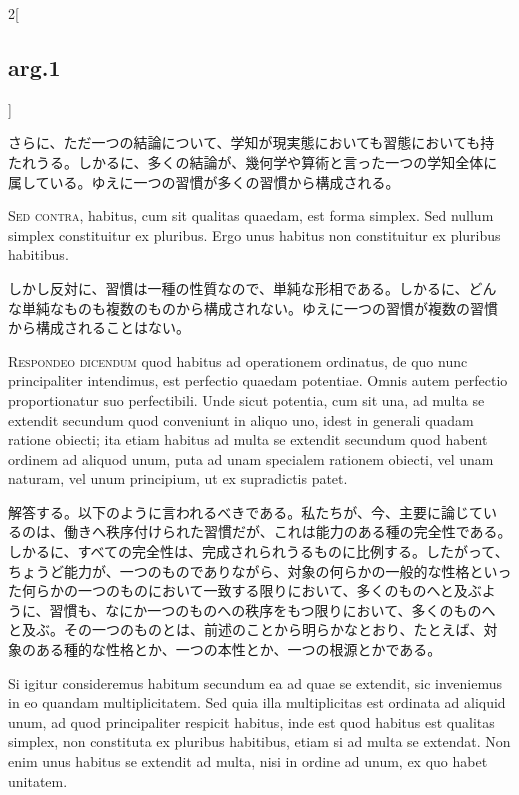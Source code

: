 \documentclass[paper=a4paper,fontsize=10pt,jafontsize=9pt,titlepage]{jlreq}
\begin{document}
\begin{paracol}{2}[\subsection{arg.1}]
\switchcolumn

さらに、ただ一つの結論について、学知が現実態においても習態においても持
たれうる。しかるに、多くの結論が、幾何学や算術と言った一つの学知全体に
属している。ゆえに一つの習慣が多くの習慣から構成される。

\switchcolumn*[\subsection{s.c.}]

{\scshape Sed contra}, habitus, cum sit qualitas quaedam, est forma
simplex. Sed nullum simplex constituitur ex pluribus. Ergo unus
habitus non constituitur ex pluribus habitibus.

\switchcolumn

しかし反対に、習慣は一種の性質なので、単純な形相である。しかるに、どん
な単純なものも複数のものから構成されない。ゆえに一つの習慣が複数の習慣
から構成されることはない。


{\scshape Respondeo dicendum} quod habitus ad operationem ordinatus,
de quo nunc principaliter intendimus, est perfectio quaedam
potentiae. Omnis autem perfectio proportionatur suo perfectibili. Unde
sicut potentia, cum sit una, ad multa se extendit secundum quod
conveniunt in aliquo uno, idest in generali quadam ratione obiecti;
ita etiam habitus ad multa se extendit secundum quod habent ordinem ad
aliquod unum, puta ad unam specialem rationem obiecti, vel unam
naturam, vel unum principium, ut ex supradictis patet.

\switchcolumn

解答する。以下のように言われるべきである。私たちが、今、主要に論じてい
るのは、働きへ秩序付けられた習慣だが、これは能力のある種の完全性である。
しかるに、すべての完全性は、完成されられうるものに比例する。したがって、
ちょうど能力が、一つのものでありながら、対象の何らかの一般的な性格といっ
た何らかの一つのものにおいて一致する限りにおいて、多くのものへと及ぶよ
うに、習慣も、なにか一つのものへの秩序をもつ限りにおいて、多くのものへ
と及ぶ。その一つのものとは、前述のことから明らかなとおり、たとえば、対
象のある種的な性格とか、一つの本性とか、一つの根源とかである。

\switchcolumn*

Si igitur consideremus habitum secundum ea ad quae se extendit, sic
inveniemus in eo quandam multiplicitatem. Sed quia illa multiplicitas
est ordinata ad aliquid unum, ad quod principaliter respicit habitus,
inde est quod habitus est qualitas simplex, non constituta ex pluribus
habitibus, etiam si ad multa se extendat. Non enim unus habitus se
extendit ad multa, nisi in ordine ad unum, ex quo habet unitatem.


\end{paracol}
\end{document}
